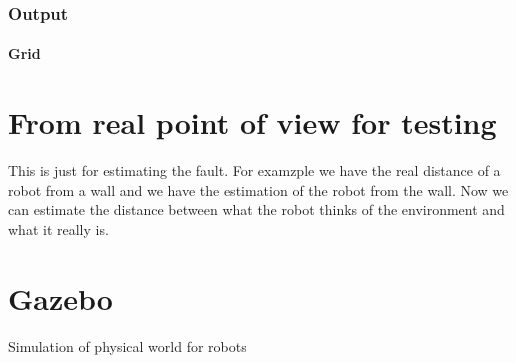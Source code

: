         \subsubsection{Output}
            \paragraph{Grid}

\section{From real point of view for testing}
    This is just for estimating the fault. For examzple we have the real distance of a robot from a wall and we have the estimation of the robot from the wall. Now we can estimate the distance between what the robot thinks of the environment and what it really is.


\section{Gazebo}
Simulation of physical world for robots
